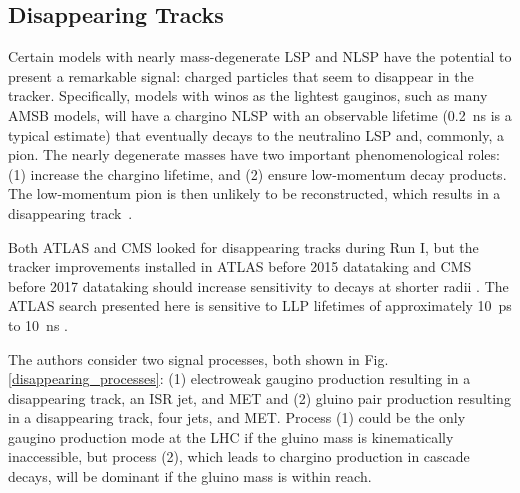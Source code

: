 \documentclass[12pt]{article}
\begin{document}
    \subsection{Disappearing Tracks}
        Certain models with nearly mass-degenerate LSP and NLSP have the potential to present a remarkable signal: charged particles that seem to disappear in the tracker. Specifically, models with winos as the lightest gauginos, such as many AMSB models, will have a chargino NLSP with an observable lifetime (\SI{0.2}{\nano\s} is a typical estimate) that eventually decays to the neutralino LSP and, commonly, a pion. The nearly degenerate masses have two important phenomenological roles: (1) increase the chargino lifetime, and (2) ensure low-momentum decay products. The low-momentum pion is then unlikely to be reconstructed, which results in a disappearing track~\cite{atlas_disappearing}.

        Both ATLAS and CMS looked for disappearing tracks during Run I, but the tracker improvements installed in ATLAS before 2015 datataking and CMS before 2017 datataking should increase sensitivity to decays at shorter radii . The ATLAS search presented here is sensitive to LLP lifetimes of approximately \SI{10}{\pico\s} to \SI{10}{\nano\s} .

        The authors consider two signal processes, both shown in Fig.\ref{disappearing_processes}: (1) electroweak gaugino production resulting in a disappearing track, an ISR jet, and MET and (2) gluino pair production resulting in a disappearing track, four jets, and MET. Process (1) could be the only gaugino production mode at the LHC if the gluino mass is kinematically inaccessible, but process (2), which leads to chargino production in cascade decays, will be dominant if the gluino mass is within reach.
\end{document}
